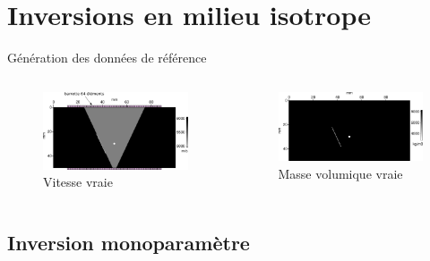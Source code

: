 \documentclass[10pt,xcolor=x11names,compress, notes=show]{beamer}%
\begin{document}
\section{Inversions en milieu isotrope}
\begin{frame}{Génération des données de référence}
	\begin{columns}
		\begin{figure}
			\includegraphics[width=\textwidth]{img/vp_true.png}
			\caption{Vitesse vraie}
		\end{figure}
		\begin{figure}
			\includegraphics[width=\textwidth]{img/rho_true.png}
			\caption{Masse volumique vraie}
		\end{figure}
	\end{columns}

\end{frame}

\subsection{Inversion monoparamètre}
\end{document}
